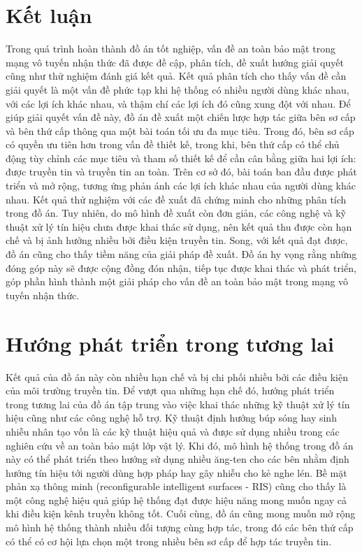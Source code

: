 \documentclass[../main.tex]{subfiles}
\begin{document}
\label{chap6}

\section{Kết luận}

Trong quá trình hoàn thành đồ án tốt nghiệp, vấn đề an toàn bảo mật trong mạng vô tuyến nhận thức đã được đề cập, phân tích, đề xuất hướng giải quyết cũng như thử nghiệm đánh giá kết quả. Kết quả phân tích cho thấy vấn đề cần giải quyết là một vấn đề phức tạp khi hệ thống có nhiều người dùng khác nhau, với các lợi ích khác nhau, và thậm chí các lợi ích đó cũng xung đột với nhau. Để giúp giải quyết vấn đề này, đồ án đề xuất một chiến lược hợp tác giữa bên sơ cấp và bên thứ cấp thông qua một bài toán tối ưu đa mục tiêu. Trong đó, bên sơ cấp có quyền ưu tiên hơn trong vấn đề thiết kế, trong khi, bên thứ cấp có thể chủ động tùy chỉnh các mục tiêu và tham số thiết kế để cần cân bằng giữa hai lợi ích: được truyền tin và truyền tin an toàn. Trên cơ sở đó, bài toán ban đầu được phát triển và mở rộng, tương ứng phản ánh các lợi ích khác nhau của người dùng khác nhau. Kết quả thử nghiệm với các đề xuất đã chứng minh cho những phân tích trong đồ án. Tuy nhiên, do mô hình đề xuất còn đơn giản, các công nghệ và kỹ thuật xử lý tín hiệu chưa được khai thác sử dụng, nên kết quả thu được còn hạn chế và bị ảnh hưởng nhiều bởi điều kiện truyền tin. Song, với kết quả đạt được, đồ án cũng cho thấy tiềm năng của giải pháp đề xuất. Đồ án hy vọng rằng những đóng góp này sẽ được cộng đồng đón nhận, tiếp tục được khai thác và phát triển, góp phần hình thành một giải pháp cho vấn đề an toàn bảo mật trong mạng vô tuyến nhận thức.

\section{Hướng phát triển trong tương lai}

Kết quả của đồ án này còn nhiều hạn chế và bị chi phối nhiều bởi các điều kiện của môi trường truyền tin. Để vượt qua những hạn chế đó, hướng phát triển trong tương lai của đồ án tập trung vào việc khai thác những kỹ thuật xử lý tín hiệu cũng như các công nghệ hỗ trợ. Kỹ thuật định hướng búp sóng hay sinh nhiễu nhân tạo vốn là các kỹ thuật hiệu quả và được sử dụng nhiều trong các nghiên cứu về an toàn bảo mật lớp vật lý. Khi đó, mô hình hệ thống trong đồ án này có thể phát triển theo hướng sử dụng nhiều ăng-ten cho các bên nhằm định hướng tín hiệu tới người dùng hợp pháp hay gây nhiễu cho kẻ nghe lén. Bề mặt phản xạ thông minh (reconfigurable intelligent surfaces - RIS) cũng cho thấy là một công nghệ hiệu quả giúp hệ thống đạt được hiệu năng mong muốn ngay cả khi điều kiện kênh truyền không tốt. Cuối cùng, đồ án cũng mong muốn mở rộng mô hình hệ thống thành nhiều đối tượng cùng hợp tác, trong đó các bên thứ cấp có thể có cơ hội lựa chọn một trong nhiều bên sơ cấp để hợp tác truyền tin.
\end{document}
